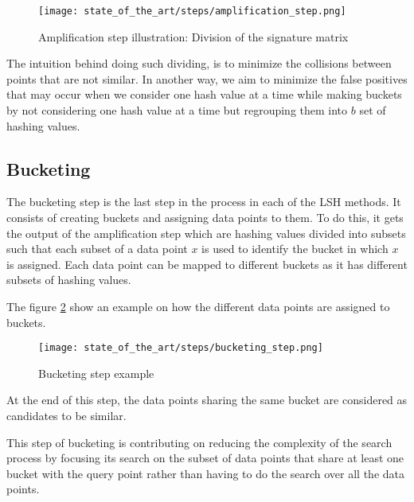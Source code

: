 \begin{figure}[h]
    \centering
    \texttt{[image: state\_of\_the\_art/steps/amplification\_step.png]}
    \caption{Amplification step illustration: Division of the signature matrix}
    \label{fig:amplification_divide_rb}
\end{figure}

The intuition behind doing such dividing, is to minimize the collisions between
points that are not similar. In another way, we aim to minimize the false
positives that may occur when we consider one hash value at a time while making
buckets by not considering one hash value at a time but regrouping them into $b$
set of hashing values.

\subsection{Bucketing}
The bucketing step is the last step in the process in each of the LSH methods.
It consists of creating buckets and assigning data points to them. To do this,
it gets the output of the amplification step which are hashing values divided
into subsets such that each subset of a data point $x$ is used to identify the
bucket in which $x$ is assigned. Each data point can be mapped to different
buckets as it has different subsets of hashing values.

The figure \ref{fig:bucketing_example} show an example on how the different data
points are assigned to buckets.

\begin{figure}[h]
    \centering
    \texttt{[image: state\_of\_the\_art/steps/bucketing\_step.png]}
    \caption{Bucketing step example}
    \label{fig:bucketing_example}
\end{figure}

At the end of this step, the data points sharing the same bucket are considered
as candidates to be similar.

This step of bucketing is contributing on reducing the complexity of the search
process by focusing its search on the subset of data points that share at least
one bucket with the query point rather than having to do the search over all the
data points.
